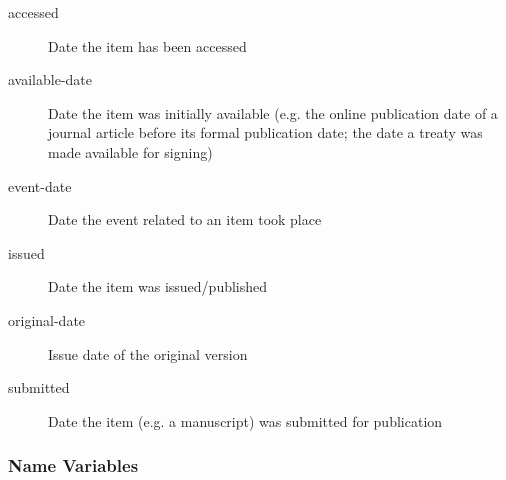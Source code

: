 \begin{description}

  \item[accessed]
    Date the item has been accessed

  \item[available-date]
    Date the item was initially available (e.g. the online publication date
    of a journal article before its formal publication date; the date a
    treaty was made available for signing)

  \item[event-date]
    Date the event related to an item took place

  \item[issued]
    Date the item was issued/published

  \item[original-date]
    Issue date of the original version

  \item[submitted]
    Date the item (e.g. a manuscript) was submitted for publication
    \end{description}

\hypertarget{name-variables}{%
\subsubsection{Name Variables}\label{name-variables}}

